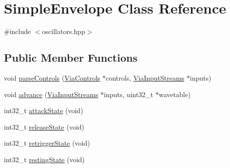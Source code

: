 \hypertarget{class_simple_envelope}{}\section{Simple\+Envelope Class Reference}
\label{class_simple_envelope}


{\ttfamily \#include $<$oscillators.\+hpp$>$}

\subsection*{Public Member Functions}
\begin{DoxyCompactItemize}
\item 
void \mbox{\hyperlink{class_simple_envelope_a0fdf4e82a5eef737eab97e47ba92eef5}{parse\+Controls}} (\mbox{\hyperlink{class_via_controls}{Via\+Controls}} $\ast$controls, \mbox{\hyperlink{class_via_input_streams}{Via\+Input\+Streams}} $\ast$inputs)
\item 
void \mbox{\hyperlink{class_simple_envelope_a4d0202e556234d3c967644fd1bea6fff}{advance}} (\mbox{\hyperlink{class_via_input_streams}{Via\+Input\+Streams}} $\ast$inputs, uint32\+\_\+t $\ast$wavetable)
\item 
int32\+\_\+t \mbox{\hyperlink{class_simple_envelope_ab9c33fdb73ee3dce2983e33f6ac44af6}{attack\+State}} (void)
\item 
int32\+\_\+t \mbox{\hyperlink{class_simple_envelope_a80ddc519be4aaa0f72a46c5b0a3b2fab}{release\+State}} (void)
\item 
int32\+\_\+t \mbox{\hyperlink{class_simple_envelope_a2348516abb5eb0cd304ea70543b2e853}{retrigger\+State}} (void)
\item 
int32\+\_\+t \mbox{\hyperlink{class_simple_envelope_a6d66b7278e15284e8dc996a73d7b042f}{resting\+State}} (void)
\end{DoxyCompactItemize}

